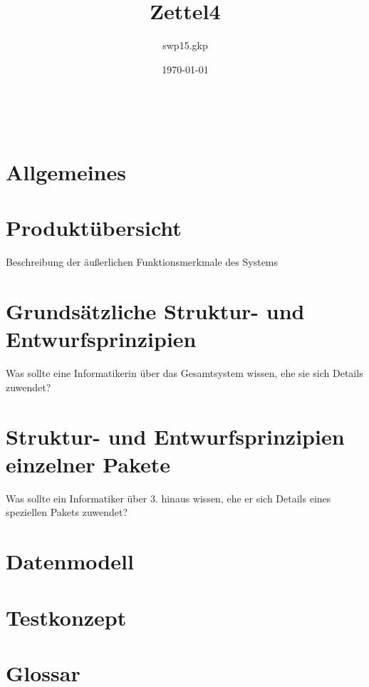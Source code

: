 \documentclass{article}
\title{Zettel4}
\author{swp15.gkp}
\date{\today{}}
\begin{document}
 \\ 

\flushleft 
\normalsize
\tableofcontents

\section{Allgemeines}

\section{Produktübersicht}
Beschreibung der äußerlichen Funktionsmerkmale des Systems

\section{Grundsätzliche Struktur- und Entwurfsprinzipien}
Was sollte eine Informatikerin über das Gesamtsystem wissen, ehe sie sich Details zuwendet?

\section{Struktur- und Entwurfsprinzipien einzelner Pakete}
Was sollte ein Informatiker über 3. hinaus wissen, ehe er sich Details eines speziellen Pakets zuwendet?

\section{Datenmodell}

\section{Testkonzept}

\section{Glossar}
\end{document}
